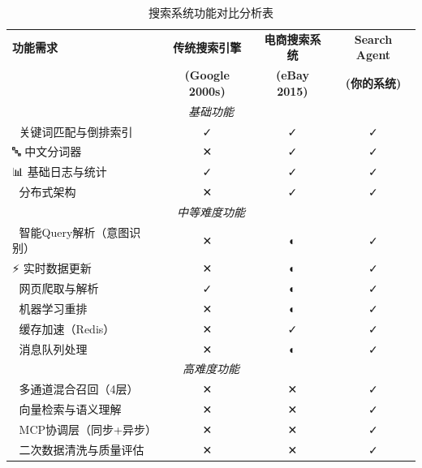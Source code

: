 \begin{table}[H]
\centering
\caption{搜索系统功能对比分析表}
\label{tab:search-system-comparison}
{\renewcommand{\arraystretch}{1.3}
\begin{tabular}{p{4cm}|c|c|c}
\hline
\textbf{功能需求} & \textbf{传统搜索引擎} & \textbf{电商搜索系统} & \textbf{Search Agent} \\
 & \textbf{(Google 2000s)} & \textbf{(eBay 2015)} & \textbf{(你的系统)} \\
\hline
\multicolumn{4}{c}{\textit{基础功能}} \\
\hline
📝 关键词匹配与倒排索引 & \cellcolor{green!20}✓ & \cellcolor{green!20}✓ & \cellcolor{green!20}✓ \\
\hline
🔤 中文分词器 & \cellcolor{red!20}✕ & \cellcolor{green!20}✓ & \cellcolor{green!20}✓ \\
\hline
📊 基础日志与统计 & \cellcolor{green!20}✓ & \cellcolor{green!20}✓ & \cellcolor{green!20}✓ \\
\hline
🔗 分布式架构 & \cellcolor{red!20}✕ & \cellcolor{green!20}✓ & \cellcolor{green!20}✓ \\
\hline
\multicolumn{4}{c}{\textit{中等难度功能}} \\
\hline
🎯 智能Query解析（意图识别） & \cellcolor{red!20}✕ & \cellcolor{yellow!20}◐ & \cellcolor{green!20}✓ \\
\hline
⚡ 实时数据更新 & \cellcolor{red!20}✕ & \cellcolor{yellow!20}◐ & \cellcolor{green!20}✓ \\
\hline
📄 网页爬取与解析 & \cellcolor{green!20}✓ & \cellcolor{yellow!20}◐ & \cellcolor{green!20}✓ \\
\hline
🤖 机器学习重排 & \cellcolor{red!20}✕ & \cellcolor{yellow!20}◐ & \cellcolor{green!20}✓ \\
\hline
🧪 缓存加速（Redis） & \cellcolor{red!20}✕ & \cellcolor{green!20}✓ & \cellcolor{green!20}✓ \\
\hline
🌊 消息队列处理 & \cellcolor{red!20}✕ & \cellcolor{yellow!20}◐ & \cellcolor{green!20}✓ \\
\hline
\multicolumn{4}{c}{\textit{高难度功能}} \\
\hline
🔀 多通道混合召回（4层） & \cellcolor{red!20}✕ & \cellcolor{red!20}✕ & \cellcolor{green!20}✓ \\
\hline
🧬 向量检索与语义理解 & \cellcolor{red!20}✕ & \cellcolor{red!20}✕ & \cellcolor{green!20}✓ \\
\hline
🔄 MCP协调层（同步+异步） & \cellcolor{red!20}✕ & \cellcolor{red!20}✕ & \cellcolor{green!20}✓ \\
\hline
🧹 二次数据清洗与质量评估 & \cellcolor{red!20}✕ & \cellcolor{red!20}✕ & \cellcolor{green!20}✓ \\

\end{tabular}}
\end{table}
